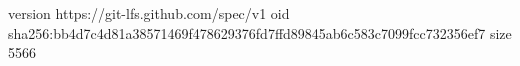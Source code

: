 version https://git-lfs.github.com/spec/v1
oid sha256:bb4d7c4d81a38571469f478629376fd7ffd89845ab6c583c7099fcc732356ef7
size 5566
